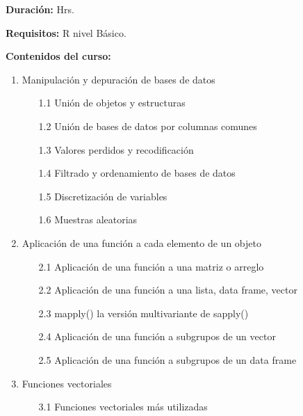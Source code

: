 \documentclass[12pt,a4paper,oneside]{article}\usepackage[]{graphicx}\usepackage[]{color}
\begin{document}
{\bf \large Duración:} Hrs.
  
{\bf \large Requisitos:}\newline
  R nivel Básico.
  
{\bf \large Contenidos del curso:}
\begin{enumerate}
   \item{Manipulación y depuración de bases de datos}
   \begin{enumerate}
      \item[1.1]{Unión de objetos y estructuras}
      \item[1.2]{Unión de bases de datos por columnas comunes}
      \item[1.3]{Valores perdidos y recodificación}
      \item[1.4]{Filtrado y ordenamiento de bases de datos}
      \item[1.5]{Discretización de variables}
      \item[1.6]{Muestras aleatorias}
   \end{enumerate}
   \item{Aplicación de una función a cada elemento de un objeto}
   \begin{enumerate}
      \item[2.1]{Aplicación de una función a una matriz o arreglo}
      \item[2.2]{Aplicación de una función a una lista, data frame, vector}
      \item[2.3]{mapply() la versión multivariante de sapply()}
      \item[2.4]{Aplicación de una función a subgrupos de un vector}
      \item[2.5]{Aplicación de una función a subgrupos de un data frame}
   \end{enumerate}
   \item{Funciones vectoriales}
   \begin{enumerate}
      \item[3.1]{Funciones vectoriales más utilizadas}

\end{enumerate}
\end{enumerate}
\end{document}

